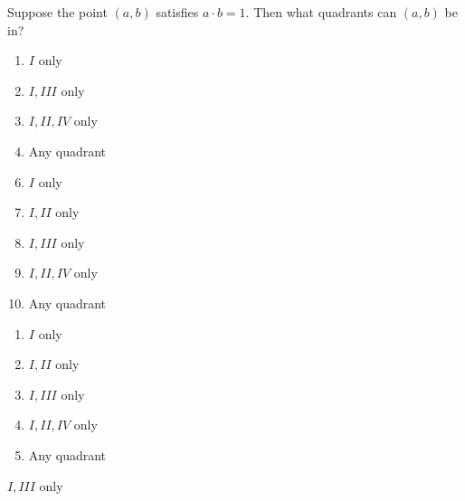 


 Suppose the point $(a,b)$ satisfies $a\cdot b=1$.  Then what quadrants can $(a,b)$ be in?



\ifsat
	\begin{enumerate}[label=\Alph*)]
		\item   $I$ only
		\item  $I,III$ only%
		\item  $I,II,IV$ only 
		\item  Any quadrant 
	\end{enumerate}
\else
\fi

\ifacteven
	\begin{enumerate}[label=\textbf{\Alph*.},itemsep=\fill,align=left]
		\setcounter{enumii}{5}
		\item   $I$ only
		\item  $I,II$ only
		\item  $I,III$ only%
		\addtocounter{enumii}{1}
		\item  $I,II,IV$ only 
		\item  Any quadrant 
	\end{enumerate}
\else
\fi

\ifactodd
	\begin{enumerate}[label=\textbf{\Alph*.},itemsep=\fill,align=left]
		\item   $I$ only
		\item  $I,II$ only
		\item  $I,III$ only%
		\item  $I,II,IV$ only 
		\item  Any quadrant 
	\end{enumerate}
\else
\fi

\ifgridin
  $I,III$ only%
		
\else
\fi

